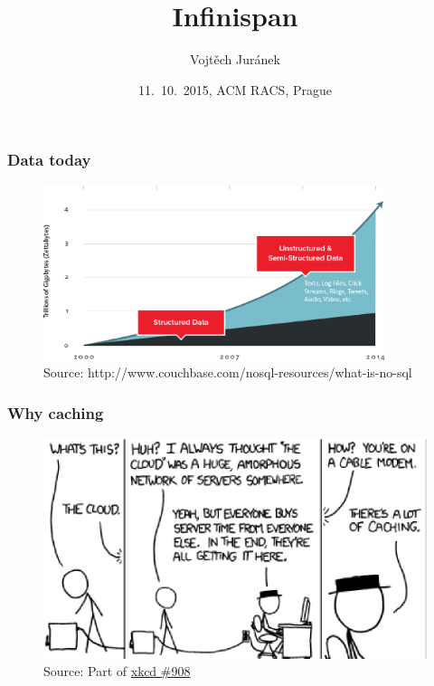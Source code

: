 \documentclass[10pt,utf8]{beamer}
\title{Infinispan}
\author{Vojtěch Juránek}
\institute[Red Hat]{JBoss - a division by Red Hat}
\date{11.~10.~2015, ACM RACS, Prague}
\begin{document}


\begin{frame}
 \titlepage
\end{frame}

\begin{frame}
	\frametitle{Data today}
	\begin{figure}
		\centering
		\includegraphics[width=10cm]{./img/why-nosql-2.eps}
		\caption{\tiny{Source: http://www.couchbase.com/nosql-resources/what-is-no-sql}}
	\end{figure}
\end{frame}

\begin{frame}
	\frametitle{Why caching}
	\begin{figure}
		\centering
		\includegraphics[width=12cm]{./img/xkcd_908.eps}
		\caption{\tiny{Source: Part of \href{http://xkcd.com/908/}{xkcd \#908}}}
	\end{figure}
\end{frame}
\end{document}
